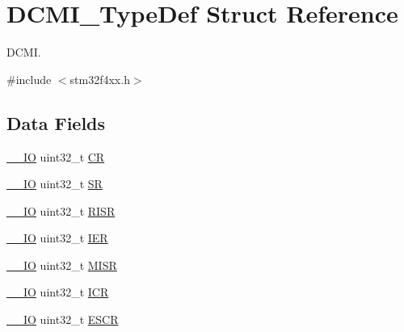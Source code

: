 \hypertarget{struct_d_c_m_i___type_def}{\section{D\-C\-M\-I\-\_\-\-Type\-Def Struct Reference}
\label{struct_d_c_m_i___type_def}
}


D\-C\-M\-I.  




{\ttfamily \#include $<$stm32f4xx.\-h$>$}

\subsection*{Data Fields}
\begin{DoxyCompactItemize}
\item 
\hyperlink{group___c_m_s_i_s__core__definitions_gaec43007d9998a0a0e01faede4133d6be}{\-\_\-\-\_\-\-I\-O} uint32\-\_\-t \hyperlink{struct_d_c_m_i___type_def_ab40c89c59391aaa9d9a8ec011dd0907a}{C\-R}
\item 
\hyperlink{group___c_m_s_i_s__core__definitions_gaec43007d9998a0a0e01faede4133d6be}{\-\_\-\-\_\-\-I\-O} uint32\-\_\-t \hyperlink{struct_d_c_m_i___type_def_af6aca2bbd40c0fb6df7c3aebe224a360}{S\-R}
\item 
\hyperlink{group___c_m_s_i_s__core__definitions_gaec43007d9998a0a0e01faede4133d6be}{\-\_\-\-\_\-\-I\-O} uint32\-\_\-t \hyperlink{struct_d_c_m_i___type_def_aa196fddf0ba7d6e3ce29bdb04eb38b94}{R\-I\-S\-R}
\item 
\hyperlink{group___c_m_s_i_s__core__definitions_gaec43007d9998a0a0e01faede4133d6be}{\-\_\-\-\_\-\-I\-O} uint32\-\_\-t \hyperlink{struct_d_c_m_i___type_def_a6566f8cfbd1d8aa7e8db046aa35e77db}{I\-E\-R}
\item 
\hyperlink{group___c_m_s_i_s__core__definitions_gaec43007d9998a0a0e01faede4133d6be}{\-\_\-\-\_\-\-I\-O} uint32\-\_\-t \hyperlink{struct_d_c_m_i___type_def_a524e134cec519206cb41d0545e382978}{M\-I\-S\-R}
\item 
\hyperlink{group___c_m_s_i_s__core__definitions_gaec43007d9998a0a0e01faede4133d6be}{\-\_\-\-\_\-\-I\-O} uint32\-\_\-t \hyperlink{struct_d_c_m_i___type_def_a0a8c8230846fd8ff154b9fde8dfa0399}{I\-C\-R}
\item 
\hyperlink{group___c_m_s_i_s__core__definitions_gaec43007d9998a0a0e01faede4133d6be}{\-\_\-\-\_\-\-I\-O} uint32\-\_\-t \hyperlink{struct_d_c_m_i___type_def_a9cc4ec74be864c929261e0810f2fd7f0}{E\-S\-C\-R}
\item 

\end{DoxyCompactItemize}
